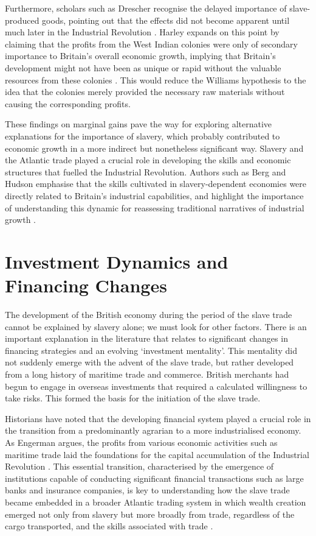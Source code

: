 \documentclass[a4paper,11pt]{article}
\begin{document}
Furthermore, scholars such as Drescher recognise the delayed importance of slave-produced goods, pointing out that the effects did not become apparent until much later in the Industrial Revolution \citep{drescher1997}. Harley expands on this point by claiming that the profits from the West Indian colonies were only of secondary importance to Britain's overall economic growth, implying that Britain's development might not have been as unique or rapid without the valuable resources from these colonies \citep{harley2015}. This would reduce the Williams hypothesis to the idea that the colonies merely provided the necessary raw materials without causing the corresponding profits.

These findings on marginal gains pave the way for exploring alternative explanations for the importance of slavery, which probably contributed to economic growth in a more indirect but nonetheless significant way. Slavery and the Atlantic trade played a crucial role in developing the skills and economic structures that fuelled the Industrial Revolution. Authors such as Berg and Hudson emphasise that the skills cultivated in slavery-dependent economies were directly related to Britain's industrial capabilities, and highlight the importance of understanding this dynamic for reassessing traditional narratives of industrial growth \citep{berghudson2021}.

\section{Investment Dynamics and Financing Changes}

The development of the British economy during the period of the slave trade cannot be explained by slavery alone; we must look for other factors. There is an important explanation in the literature that relates to significant changes in financing strategies and an evolving ‘investment mentality’. This mentality did not suddenly emerge with the advent of the slave trade, but rather developed from a long history of maritime trade and commerce. British merchants had begun to engage in overseas investments that required a calculated willingness to take risks. This formed the basis for the initiation of the slave trade.

Historians have noted that the developing financial system played a crucial role in the transition from a predominantly agrarian to a more industrialised economy. As Engerman argues, the profits from various economic activities such as maritime trade laid the foundations for the capital accumulation of the Industrial Revolution \citep{eltisengerman2000}. This essential transition, characterised by the emergence of institutions capable of conducting significant financial transactions such as large banks and insurance companies, is key to understanding how the slave trade became embedded in a broader Atlantic trading system in which wealth creation emerged not only from slavery but more broadly from trade, regardless of the cargo transported, and the skills associated with trade \citep{solow1985}.
\end{document}
